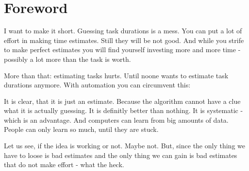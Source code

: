 \hypertarget{foreword}{%
\section{Foreword}\label{foreword}}

I want to make it short. Guessing task durations is a mess. You can put
a lot of effort in making time estimates. Still they will be not good.
And while you strife to make perfect estimates you will find yourself
investing more and more time - possibly a lot more than the task is
worth.

More than that: estimating tasks hurts. Until noone wants to estimate
task durations anymore. With automation you can circumvent this:

It is clear, that it is just an estimate. Because the algorithm cannot
have a clue what it is actually guessing. It is definitly better than
nothing. It is systematic - which is an advantage. And computers can
learn from big amounts of data. People can only learn so much, until
they are stuck.

Let us see, if the idea is working or not. Maybe not. But, since the
only thing we have to loose is bad estimates and the only thing we can
gain is bad estimates that do not make effort - what the heck.
